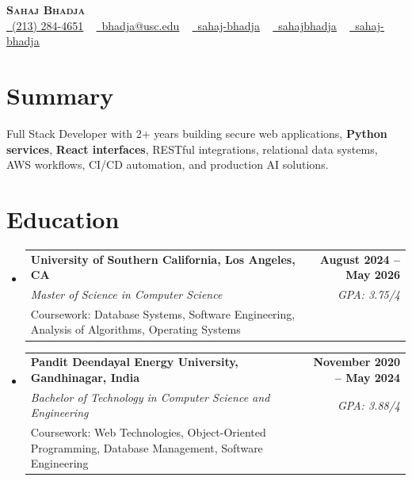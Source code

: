 \documentclass[letterpaper,10pt]{article}
\makeatletter
\newcommand{\sectionGap}{\vspace{-8pt}}
\newcommand{\resumeEduSubheading}[5]{\vspace{-1pt}\item\begin{tabular*}{1.0\textwidth}[t]{l@{\extracolsep{\fill}}r}\textbf{#1} & \textbf{\small #2} \\\textit{\small #3} & \textit{\small #4} \\\small #5 & \\\end{tabular*}\vspace{-4pt}}
\newcommand{\resumeSubHeadingListStart}{\begin{itemize}[leftmargin=0.0in, label={}]}
\newcommand{\resumeSubHeadingListEnd}{\end{itemize}}
\makeatother
\begin{document}
\begin{center}
{\Huge \scshape \textbf{Sahaj Bhadja}} \\ \vspace{1pt}
\small \href{tel:2132844651}{\faPhone\ \underline{(213) 284-4651}} ~ \href{mailto:bhadja@usc.edu}{\raisebox{-0.2\height}\faEnvelope\ \underline{bhadja@usc.edu}} ~
\href{https://www.linkedin.com/in/sahaj-bhadja/}{\raisebox{-0.2\height}\faLinkedin\ \underline{sahaj-bhadja}} ~ \href{https://github.com/SAHAJ-BHADJA}{\raisebox{-0.2\height}\faGithub\ \underline{sahajbhadja}} ~
\href{https://sahaj-bhadja.vercel.app/}{\raisebox{-0.2\height}\faGlobe\ \underline{sahaj-bhadja}}
\end{center}
\vspace{-16pt}
\section{Summary}
\begin{itemize}[leftmargin=0.15in, label={}]
\small{\item{Full Stack Developer with 2+ years building secure web applications, \textbf{Python services}, \textbf{React interfaces}, RESTful integrations, relational data systems, AWS workflows, CI/CD automation, and production AI solutions.}}
\end{itemize}
\sectionGap
\section{Education}
\resumeSubHeadingListStart
\resumeEduSubheading{University of Southern California, Los Angeles, CA}{August 2024 -- May 2026}{Master of Science in Computer Science}{GPA: 3.75/4}{Coursework: Database Systems, Software Engineering, Analysis of Algorithms, Operating Systems}
\resumeEduSubheading{Pandit Deendayal Energy University, Gandhinagar, India}{November 2020 -- May 2024}{Bachelor of Technology in Computer Science and Engineering}{GPA: 3.88/4}{Coursework: Web Technologies, Object-Oriented Programming, Database Management, Software Engineering}
\resumeSubHeadingListEnd
\sectionGap
\end{document}
